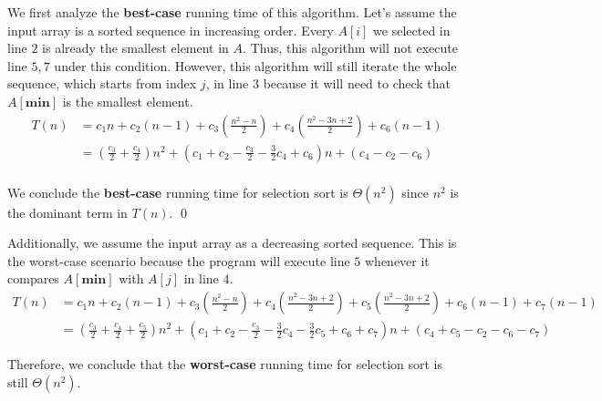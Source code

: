 \documentclass[a4paper]{article}
\makeatletter
\newenvironment{solution}
  {\begin{proof}[Solution]}
  {\end{proof}}
\renewenvironment{proof}[1][\proofname]{%
  \par\pushQED{\qed}\normalfont%
  \topsep6\p@\@plus6\p@\relax
  \trivlist\item[\hskip\labelsep\bfseries#1\@addpunct{.}]%
  \ignorespaces
}{%
  \popQED\endtrivlist\@endpefalse
}
\makeatother
\begin{document}
\begin{solution}
  We first analyze the \textbf{best-case} running time of this algorithm. Let's assume the input array is a sorted sequence in increasing order. Every $A[i]$ we selected in line $2$ is already the smallest element in $A$. Thus, this algorithm will not execute line $5, 7$ under this condition. However, this algorithm will still iterate the whole sequence, which starts from index $j$, in line $3$ because it will need to check that $A[\textbf{min}]$ is the smallest element.
  \begin{align*}
    T(n)  &= c_1 n + c_2(n - 1) + c_3(\frac{n^2 - n}{2}) + c_4(\frac{n^2 - 3n + 2}{2}) + c_6(n -1)\\
         &= (\frac{c_3}{2} + \frac{c_4}{2}) n^2 + (c_1 + c_2 - \frac{c_3}{2} - \frac{3}{2}c_4 + c_6)n + (c_4 - c_2 - c_6) \\
  \end{align*}

  We conclude the \textbf{best-case} running time for selection sort is $\Theta(n^2)$ since $n^2$ is the dominant term in $T(n)$. \qed

  Additionally, we assume the input array as a decreasing sorted sequence. This is the worst-case scenario because the program will execute line $5$ whenever it compares $A[\textbf{min}]$ with $A[j]$ in line $4$.
  \begin{align*}
    T(n) &=c_1 n + c_2(n - 1) + c_3(\frac{n^2 - n}{2}) + c_4(\frac{n^2 - 3n + 2}{2})+c_5(\frac{n^2 - 3n + 2}{2}) + c_6(n - 1) + c_7(n - 1)\\
         &= (\frac{c_3}{2} + \frac{c_4}{2} + \frac{c_5}{2})n^2 + (c_1 + c_2 - \frac{c_3}{2} - \frac{3}{2}c_4 - \frac{3}{2}c_5 + c_6 + c_7)n + (c_4 + c_5 - c_2 - c_6 - c_7)
  \end{align*}

  Therefore, we conclude that the \textbf{worst-case} running time for selection sort is still $\Theta(n^2)$.
\end{solution}
\end{document}
